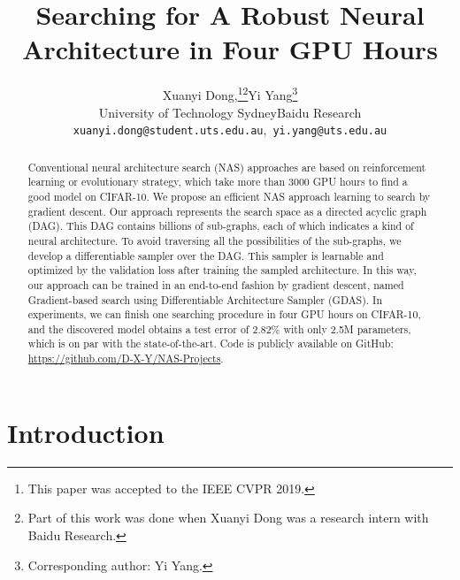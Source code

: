 \documentclass[10pt,twocolumn,letterpaper]{article}
\begin{document}
\title{Searching for A Robust Neural Architecture in Four GPU Hours}

\author{Xuanyi Dong,\thanks{This paper was accepted to the IEEE CVPR 2019.}\thanks{Part of this work was done when Xuanyi Dong was a research intern with Baidu Research.}Yi Yang\thanks{Corresponding author: Yi Yang.}\\
University of Technology Sydney\hspace{4mm}Baidu Research \\
{\tt\small xuanyi.dong@student.uts.edu.au},~{\tt\small yi.yang@uts.edu.au}
}


\maketitle
\thispagestyle{empty}

\begin{abstract}

Conventional neural architecture search (NAS) approaches are based on reinforcement learning or evolutionary strategy, which take more than 3000 GPU hours to find a good model on CIFAR-10.
We propose an efficient NAS approach learning to search by gradient descent.
Our approach represents the search space as a directed acyclic graph (DAG). This DAG contains billions of sub-graphs, each of which indicates a kind of neural architecture.
To avoid traversing all the possibilities of the sub-graphs, we develop a differentiable sampler over the DAG.
This sampler is learnable and optimized by the validation loss after training the sampled architecture.
In this way, our approach can be trained in an end-to-end fashion by gradient descent, named Gradient-based search using Differentiable Architecture Sampler (GDAS).
In experiments, we can finish one searching procedure in four GPU hours on CIFAR-10, and the discovered model obtains a test error of 2.82\% with only 2.5M parameters, which is on par with the state-of-the-art.
Code is publicly available on GitHub: \url{https://github.com/D-X-Y/NAS-Projects}.
\end{abstract}



\section{Introduction}
\end{document}
